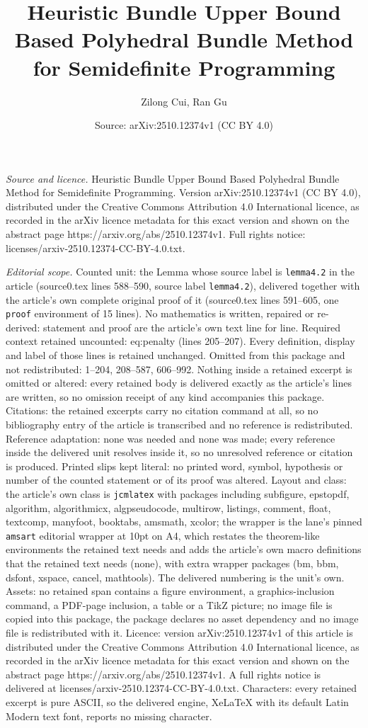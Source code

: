 \documentclass[10pt,a4paper]{amsart}
\title[Heuristic Bundle Upper Bound Based Polyhedral Bundle Method ]{Heuristic Bundle Upper Bound Based Polyhedral Bundle Method for Semidefinite Programming}
\author{Zilong Cui, Ran Gu}
\date{Source: arXiv:2510.12374v1 (CC BY 4.0)}
\begin{document}
\maketitle

\noindent\emph{Source and licence.} Heuristic Bundle Upper Bound Based Polyhedral Bundle Method for Semidefinite Programming. Version arXiv:2510.12374v1 (CC BY 4.0), distributed under the Creative Commons Attribution 4.0 International licence, as recorded in the arXiv licence metadata for this exact version and shown on the abstract page https://arxiv.org/abs/2510.12374v1. Full rights notice: licenses/arxiv-2510.12374-CC-BY-4.0.txt.\par\smallskip

\noindent\textit{Editorial scope.} Counted unit: the Lemma whose source label is \texttt{lemma4.2} in the article (source0.tex lines 588--590, source label \texttt{lemma4.2}), delivered together with the article's own complete original proof of it (source0.tex lines 591--605, one \texttt{proof} environment of 15 lines). No mathematics is written, repaired or re-derived: statement and proof are the article's own text line for line. Required context retained uncounted: eq:penalty (lines 205--207). Every definition, display and label of those lines is retained unchanged. Omitted from this package and not redistributed: 1--204, 208--587, 606--992. Nothing inside a retained excerpt is omitted or altered: every retained body is delivered exactly as the article's lines are written, so no omission receipt of any kind accompanies this package. Citations: the retained excerpts carry no citation command at all, so no bibliography entry of the article is transcribed and no reference is redistributed. Reference adaptation: none was needed and none was made; every reference inside the delivered unit resolves inside it, so no unresolved reference or citation is produced. Printed slips kept literal: no printed word, symbol, hypothesis or number of the counted statement or of its proof was altered. Layout and class: the article's own class is \texttt{jcmlatex} with packages including subfigure, epstopdf, algorithm, algorithmicx, algpseudocode, multirow, listings, comment, float, textcomp, manyfoot, booktabs, amsmath, xcolor; the wrapper is the lane's pinned \texttt{amsart} editorial wrapper at 10pt on A4, which restates the theorem-like environments the retained text needs and adds the article's own macro definitions that the retained text needs (none), with extra wrapper packages (bm, bbm, dsfont, xspace, cancel, mathtools). The delivered numbering is the unit's own. Assets: no retained span contains a figure environment, a graphics-inclusion command, a PDF-page inclusion, a table or a TikZ picture; no image file is copied into this package, the package declares no asset dependency and no image file is redistributed with it. Licence: version arXiv:2510.12374v1 of this article is distributed under the Creative Commons Attribution 4.0 International licence, as recorded in the arXiv licence metadata for this exact version and shown on the abstract page https://arxiv.org/abs/2510.12374v1. A full rights notice is delivered at licenses/arxiv-2510.12374-CC-BY-4.0.txt. Characters: every retained excerpt is pure ASCII, so the delivered engine, XeLaTeX with its default Latin Modern text font, reports no missing character.
\end{document}
